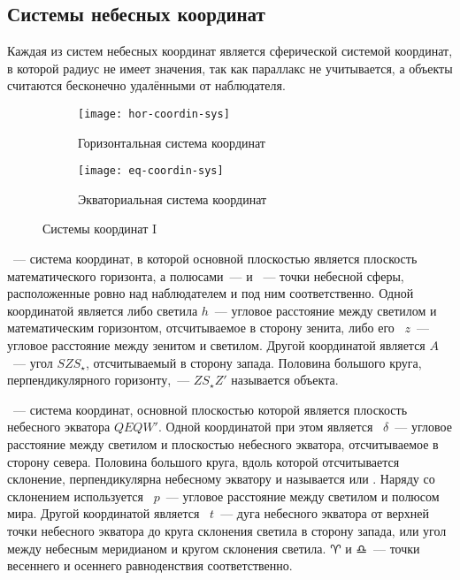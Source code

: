 \subsection{Системы небесных координат}
Каждая из систем небесных координат является сферической системой координат, в которой радиус не имеет значения, так как параллакс не учитывается, а объекты считаются бесконечно удалёнными от наблюдателя.

\begin{figure}[!h]
\centering
	\begin{subfigure}{0.49\textwidth}
		\texttt{[image: hor-coordin-sys]}
		\caption{Горизонтальная система координат}
	 \end{subfigure}
	 \hfill
	\begin{subfigure}{0.49\textwidth}
		\texttt{[image: eq-coordin-sys]}
		\caption{Экваториальная система координат}
	 \end{subfigure}
	\caption{Системы координат I}
\end{figure}
~--- система координат, в которой основной плоскостью является плоскость математического горизонта, а полюсами~---  и ~--- точки небесной сферы, расположенные ровно над наблюдателем и под ним соответственно. Одной координатой является либо  светила $h$~--- угловое расстояние между светилом и математическим горизонтом, отсчитываемое в сторону зенита, либо его ~$z$~--- угловое расстояние между зенитом и светилом. Другой координатой является  $A$~--- угол $SZS_\star$, отсчитываемый в сторону запада. Половина большого круга, перпендикулярного горизонту,~--- $Z S_\star Z'$  называется  объекта.

~--- система координат, 
основной плоскостью которой является плоскость небесного экватора $QEQW'$. 
Одной координатой при этом является ~$\delta$~--- угловое 
расстояние между светилом и плоскостью небесного экватора, отсчитываемое в 
сторону севера. Половина большого круга, вдоль которой отсчитывается склонение, 
перпендикулярна небесному экватору и называется  или 
. Наряду со склонением
используется ~$p$~--- угловое расстояние между 
светилом и полюсом мира. Другой координатой является ~$t$~--- 
дуга небесного экватора от верхней точки небесного экватора до круга склонения 
светила в сторону запада, или угол между небесным меридианом и кругом склонения 
светила. $\aries$ и $\libra$~--- точки весеннего и осеннего равноденствия соответственно. 

